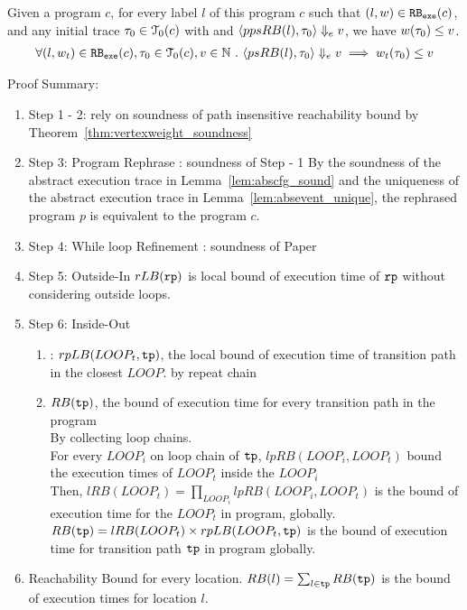 \begin{thm}
  Given a program ${c}$, for every label $l$ of this program $c$ such that $(l, w) \in \mathtt{RB_{exe}}(c)$, 
  and any initial trace $\mathtt{\tau}_0 \in \mathcal{T}_0(c)$ with 
  and $\langle ppsRB(l), \mathtt{\tau}_0 \rangle \Downarrow_e v$,
  we have $ w(\mathtt{\tau}_0) \leq v $.
  \[
    \begin{array}{l}
    \forall (l, w_{t}) \in \mathtt{RB_{exe}}(c),
    \mathtt{\tau}_0 \in \mathcal{T}_0(c), 
    v \in \mathbb{N} ~.~
    \langle psRB(l), \mathtt{\tau}_0 \rangle \Downarrow_e v
    \implies
    w_{t}(\mathtt{\tau}_0) \leq v
    \end{array}
  \]
  \end{thm}
Proof Summary:
\begin{enumerate}
\item Step 1 - 2: rely on soundness of path insensitive reachability bound by Theorem~\ref{thm:vertexweight_soundness}
\\
\item Step 3: Program Rephrase : soundness of Step - 1
By the soundness of the abstract execution trace in Lemma~\ref{lem:abscfg_sound}
and the uniqueness of the abstract execution trace in Lemma~\ref{lem:absevent_unique},
the rephrased program $p$ is equivalent to the program $c$.
\\
\item Step 4: While loop Refinement : soundness of Paper \cite{GulwaniJK09}
\\
\item Step 5: Outside-In 
$rLB(\mathtt{rp})$ is local bound of execution time of $\mathtt{rp}$ without considering outside loops.
\\
\item Step 6: Inside-Out
\begin{enumerate}
\item: $rpLB(LOOP_t, \mathtt{tp})$, the local bound of execution time of 
transition path in the closest $LOOP$.
by repeat chain 
\item $RB(\mathtt{tp})$, the bound of execution time for every transition path in the program
\\
By collecting loop chains.
\\
For every $LOOP_i$ on loop chain of $\mathtt{tp}$, $lpRB(LOOP_i, LOOP_t)$ bound the execution times of $LOOP_t$ inside the $LOOP_i$
\\
Then, $lRB(LOOP_t) = \prod_{LOOP_i} lpRB(LOOP_i, LOOP_t)$ is the bound of execution time for the $LOOP_t$ in program, globally.
\\
$RB(\mathtt{tp}) = lRB(LOOP_t) \times rpLB(LOOP_t, \mathtt{tp}) $ is the bound of execution time for transition path $\mathtt{tp}$ 
in program globally.
\end{enumerate}
\item Reachability Bound for every location.
$RB(l) = \sum_{l \in \mathtt{tp}}RB(\mathtt{tp})$ is the bound of execution times for location $l$.

\end{enumerate}
